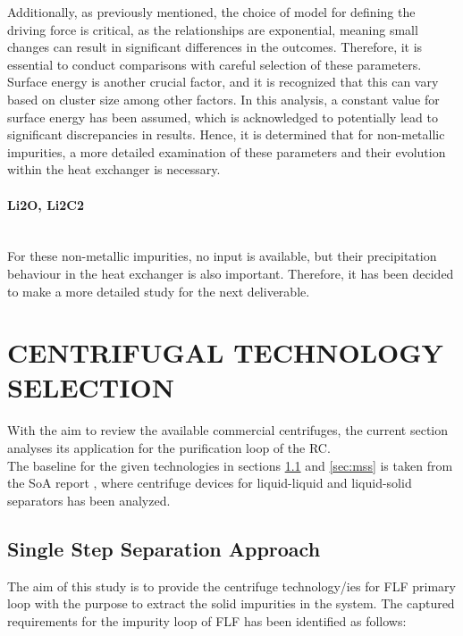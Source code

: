 Additionally, as previously mentioned, the choice of model for defining the driving force is critical, as the relationships are exponential, 
meaning small changes can result in significant differences in the outcomes. Therefore, it is essential to conduct comparisons with careful 
selection of these parameters. Surface energy is another crucial factor, and it is recognized that this can vary based on cluster size among 
other factors. In this analysis, a constant value for surface energy has been assumed, which is acknowledged to potentially lead to significant 
discrepancies in results. Hence, it is determined that for non-metallic impurities, a more detailed examination of these parameters and their 
evolution within the heat exchanger is necessary.

\paragraph{Li2O, Li2C2}~\\
\vspace{1mm} %
For these non-metallic impurities, no input is available, but their precipitation behaviour in the heat 
exchanger is also important. Therefore, it has been decided to make a more detailed study for the next deliverable.

\newpage

\section{CENTRIFUGAL TECHNOLOGY SELECTION} \label{sec:eng}%
With the aim to review the available commercial centrifuges, the current section analyses its application for the purification loop of the RC. \\

\noindent The baseline for the given technologies in sections \ref{sec:sss} and \ref{sec:mss} is taken from the SoA report \cite{SoA}, where centrifuge devices for liquid-liquid and liquid-solid separators has been analyzed. 

\subsection{Single Step Separation Approach}\label{sec:sss}
The aim of this study is to provide the centrifuge technology/ies for FLF primary loop with the purpose to extract the solid impurities in the system. The captured requirements for the impurity loop of FLF has been identified as follows:

